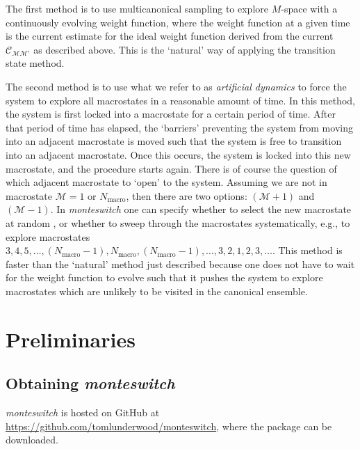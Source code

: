 \documentclass{report}
\begin{document}
The first method is to use multicanonical sampling to explore $M$-space with a continuously evolving weight function, where the weight function
at a given time is the current estimate for the ideal weight function derived from the current $\mathcal{C}_{\mathcal{M}\mathcal{M}'}$ as described above.
This is the `natural' way of applying the transition state method.

The second method is to use what we refer to as \emph{artificial dynamics} to force the system to explore all macrostates in a reasonable amount of time. 
In this method, the system is first locked into a macrostate for a certain period of time. After that period of time has elapsed, the `barriers' preventing
the system from moving into an adjacent macrostate is moved such that the system is free to transition into an adjacent macrostate. Once this occurs,
the system is locked into this new macrostate, and the procedure starts again. There is of course the question of which adjacent macrostate to `open'
to the system. Assuming we are not in macrostate $\mathcal{M}=1$ or $N_{\text{macro}}$, then there are two options: $(\mathcal{M}+1)$ and $(\mathcal{M}-1)$.
In \emph{monteswitch} one can specify whether to select the new macrostate at random \cite{thesis:Jackson}, 
or whether to sweep through the macrostates systematically, e.g., to explore macrostates 
$3,4,5,\dotsc,(N_{\text{macro}}-1),N_{\text{macro}},(N_{\text{macro}}-1),\dotsc,3,2,1,2,3,\dotsc$. This method is faster than the `natural'
method just described because one does not have to wait for the weight function to evolve such that it pushes the system to explore macrostates which
are unlikely to be visited in the canonical ensemble.




\chapter{Preliminaries}\label{chapter:preliminaries}

\section{Obtaining \emph{monteswitch}}
\emph{monteswitch} is hosted on GitHub at \url{https://github.com/tomlunderwood/monteswitch}, where the package can be downloaded.
\end{document}
